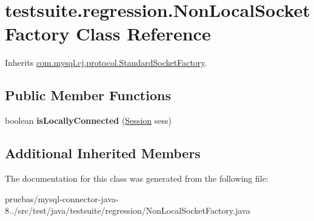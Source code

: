 \hypertarget{classtestsuite_1_1regression_1_1_non_local_socket_factory}{}\section{testsuite.\+regression.\+Non\+Local\+Socket\+Factory Class Reference}
\label{classtestsuite_1_1regression_1_1_non_local_socket_factory}


Inherits \mbox{\hyperlink{classcom_1_1mysql_1_1cj_1_1protocol_1_1_standard_socket_factory}{com.\+mysql.\+cj.\+protocol.\+Standard\+Socket\+Factory}}.

\subsection*{Public Member Functions}
\begin{DoxyCompactItemize}
\item 
\mbox{\label{classtestsuite_1_1regression_1_1_non_local_socket_factory_a6777c5f47cc9b67f228c1b4cbf46d18d}} 
boolean {\bfseries is\+Locally\+Connected} (\mbox{\hyperlink{interfacecom_1_1mysql_1_1cj_1_1_session}{Session}} sess)
\end{DoxyCompactItemize}
\subsection*{Additional Inherited Members}


The documentation for this class was generated from the following file\+:\begin{DoxyCompactItemize}
\item 
pruebas/mysql-\/connector-\/java-\/8../src/test/java/testsuite/regression/Non\+Local\+Socket\+Factory.\+java\end{DoxyCompactItemize}
